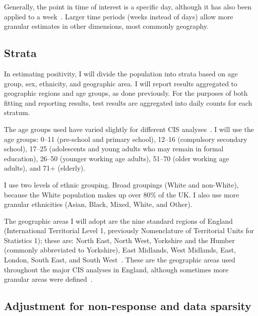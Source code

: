 \documentclass[thesis.tex]{subfiles}
\begin{document}
Generally, the point in time of interest is a specific day, although it has also been applied to a week~\autocite{cisMethodsONS,pouwelsMRPvaccination,pouwelsCommunity}.
Larger time periods (\ie weeks instead of days) allow more granular estimates in other dimensions, most commonly geography.

\subsection{Strata} \label{biology-data:sec:cis-strata}

In estimating positivity, I will divide the population into strata based on age group, sex, ethnicity, and geographic area.
I will report results aggregated to geographic regions and age groups, as done previously.
For the purposes of both fitting and reporting results, test results are aggregated into daily counts for each stratum.

The age groups used have varied slightly for different CIS analyses~\autocite[e.g.][]{pouwelsMRPvaccination,pouwelsCommunity,cisMethodsONS,houseInferring,walkerTracking}.
I will use the age groups: 0--11 (pre-school and primary school), 12--16 (compulsory secondary school), 17--25 (adolescents and young adults who may remain in formal education), 26--50 (younger working age adults), 51--70 (older working age adults), and 71+ (elderly).

I use two levels of ethnic grouping.
Broad groupings (White and non-White), because the White population makes up over 80\% of the UK.
I also use more granular ethnicities (Asian, Black, Mixed, White, and Other).

The geographic areas I will adopt are the nine standard regions of England (International Territorial Level 1, previously Nomenclature of Territorial Units for Statistics 1); these are: North East, North West, Yorkshire and the Humber (commonly abbreviated to Yorkshire), East Midlands, West Midlands, East, London, South East, and South West~\autocite{onsRegions}.
These are the geographic areas used throughout the major CIS analyses in England, although sometimes more granular areas were defined~\autocite[e.g.][]{pouwelsMRPvaccination,pouwelsCommunity,cisMethodsONS,houseInferring,walkerTracking}.

\subsection{Adjustment for non-response and data sparsity} \label{biology-data:sec:MRP}
\end{document}
